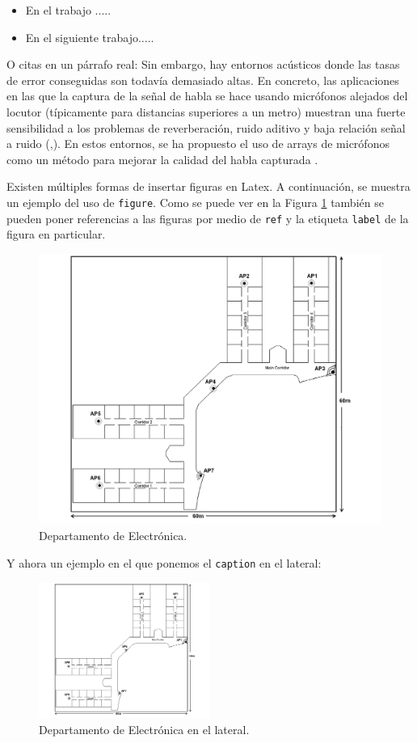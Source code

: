 \documentclass[spanish,openright]{book}
\begin{document}
\begin{itemize}
\item En el trabajo .....
\item En el siguiente trabajo.....
\end{itemize}

O citas en un párrafo real: Sin embargo, hay entornos acústicos donde
las tasas de error conseguidas son todavía demasiado altas. En concreto,
las aplicaciones en las que la captura de la señal de habla se hace
usando micrófonos alejados del locutor (típicamente para distancias
superiores a un metro) muestran una fuerte sensibilidad a los problemas
de reverberación, ruido aditivo y baja relación señal a ruido
(\cite{gelbart02},\cite{kochkin02}). En estos entornos, se ha propuesto
el uso de arrays de micrófonos como un método para mejorar la calidad
del habla capturada \cite{seltzer03}\cite{herbordt05}.

Existen múltiples formas de insertar figuras en Latex. A continuación,
se muestra un ejemplo del uso de \texttt{figure}. Como se puede ver en
la Figura \ref{fig1} también se pueden poner referencias a las figuras
por medio de \texttt{ref} y la etiqueta \texttt{label} de la figura en
particular.

\begin{figure}[h] \centering
\includegraphics[width=4.7in]{Figure1}
\caption{Departamento de Electrónica.}
\label{fig1}
\end{figure}

Y ahora un ejemplo en el que ponemos el \texttt{caption} en el lateral:

\begin{figure}
\centering
\includegraphics[width=0.5\textwidth]{Figure1}
\caption{Departamento de Electrónica en el lateral.}
\end{figure}
\end{document}
